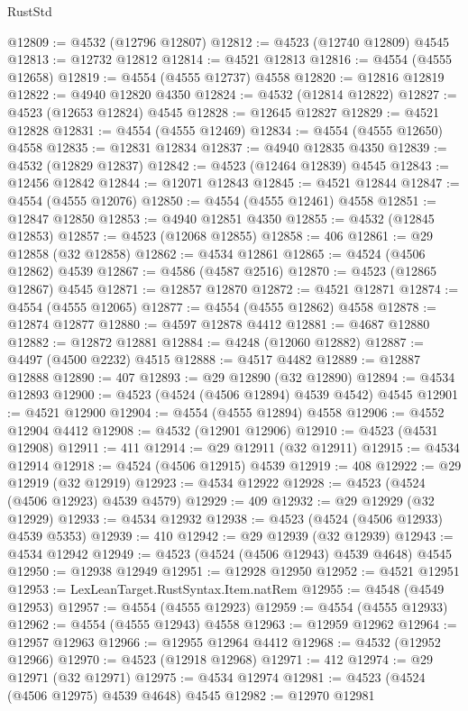 \begin{lexlean}{RustStd}
\begin{coremodule}
@12809 := @4532 (@12796 @12807)
@12812 := @4523 (@12740 @12809) @4545
@12813 := @12732 @12812
@12814 := @4521 @12813
@12816 := @4554 (@4555 @12658)
@12819 := @4554 (@4555 @12737) @4558
@12820 := @12816 @12819
@12822 := @4940 @12820 @4350
@12824 := @4532 (@12814 @12822)
@12827 := @4523 (@12653 @12824) @4545
@12828 := @12645 @12827
@12829 := @4521 @12828
@12831 := @4554 (@4555 @12469)
@12834 := @4554 (@4555 @12650) @4558
@12835 := @12831 @12834
@12837 := @4940 @12835 @4350
@12839 := @4532 (@12829 @12837)
@12842 := @4523 (@12464 @12839) @4545
@12843 := @12456 @12842
@12844 := @12071 @12843
@12845 := @4521 @12844
@12847 := @4554 (@4555 @12076)
@12850 := @4554 (@4555 @12461) @4558
@12851 := @12847 @12850
@12853 := @4940 @12851 @4350
@12855 := @4532 (@12845 @12853)
@12857 := @4523 (@12068 @12855)
@12858 := 406
@12861 := @29 @12858 (@32 @12858)
@12862 := @4534 @12861
@12865 := @4524 (@4506 @12862) @4539
@12867 := @4586 (@4587 @2516)
@12870 := @4523 (@12865 @12867) @4545
@12871 := @12857 @12870
@12872 := @4521 @12871
@12874 := @4554 (@4555 @12065)
@12877 := @4554 (@4555 @12862) @4558
@12878 := @12874 @12877
@12880 := @4597 @12878 @4412
@12881 := @4687 @12880
@12882 := @12872 @12881
@12884 := @4248 (@12060 @12882)
@12887 := @4497 (@4500 @2232) @4515
@12888 := @4517 @4482
@12889 := @12887 @12888
@12890 := 407
@12893 := @29 @12890 (@32 @12890)
@12894 := @4534 @12893
@12900 := @4523 (@4524 (@4506 @12894) @4539 @4542) @4545
@12901 := @4521 @12900
@12904 := @4554 (@4555 @12894) @4558
@12906 := @4552 @12904 @4412
@12908 := @4532 (@12901 @12906)
@12910 := @4523 (@4531 @12908)
@12911 := 411
@12914 := @29 @12911 (@32 @12911)
@12915 := @4534 @12914
@12918 := @4524 (@4506 @12915) @4539
@12919 := 408
@12922 := @29 @12919 (@32 @12919)
@12923 := @4534 @12922
@12928 := @4523 (@4524 (@4506 @12923) @4539 @4579)
@12929 := 409
@12932 := @29 @12929 (@32 @12929)
@12933 := @4534 @12932
@12938 := @4523 (@4524 (@4506 @12933) @4539 @5353)
@12939 := 410
@12942 := @29 @12939 (@32 @12939)
@12943 := @4534 @12942
@12949 := @4523 (@4524 (@4506 @12943) @4539 @4648) @4545
@12950 := @12938 @12949
@12951 := @12928 @12950
@12952 := @4521 @12951
@12953 := LexLeanTarget.RustSyntax.Item.natRem
@12955 := @4548 (@4549 @12953)
@12957 := @4554 (@4555 @12923)
@12959 := @4554 (@4555 @12933)
@12962 := @4554 (@4555 @12943) @4558
@12963 := @12959 @12962
@12964 := @12957 @12963
@12966 := @12955 @12964 @4412
@12968 := @4532 (@12952 @12966)
@12970 := @4523 (@12918 @12968)
@12971 := 412
@12974 := @29 @12971 (@32 @12971)
@12975 := @4534 @12974
@12981 := @4523 (@4524 (@4506 @12975) @4539 @4648) @4545
@12982 := @12970 @12981

\end{coremodule}
\end{lexlean}
